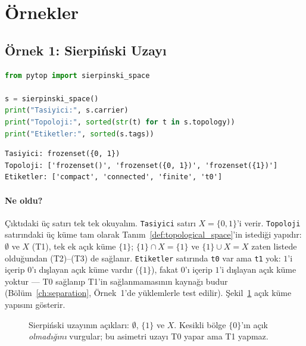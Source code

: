 \section{Örnekler}

\subsection{Örnek 1: Sierpiński Uzayı}

\begin{lstlisting}[language=Python, caption={Sierpiński uzayı}]
from pytop import sierpinski_space

s = sierpinski_space()
print("Tasiyici:", s.carrier)
print("Topoloji:", sorted(str(t) for t in s.topology))
print("Etiketler:", sorted(s.tags))
\end{lstlisting}

\begin{lstlisting}[caption={Çıktı}]
Tasiyici: frozenset({0, 1})
Topoloji: ['frozenset()', 'frozenset({0, 1})', 'frozenset({1})']
Etiketler: ['compact', 'connected', 'finite', 't0']
\end{lstlisting}

\paragraph{Ne oldu?}
Çıktıdaki üç satırı tek tek okuyalım. \texttt{Tasiyici} satırı
$X=\{0,1\}$'i verir. \texttt{Topoloji} satırındaki üç küme tam olarak
Tanım~\ref{def:topological_space}'in istediği yapıdır: $\emptyset$ ve
$X$ (T1), tek ek açık küme $\{1\}$; $\{1\}\cap X=\{1\}$ ve
$\{1\}\cup X=X$ zaten listede olduğundan (T2)--(T3) de sağlanır.
\texttt{Etiketler} satırında \texttt{t0} var ama \texttt{t1} yok:
$1$'i içerip $0$'ı dışlayan açık küme vardır ($\{1\}$), fakat $0$'ı
içerip $1$'i dışlayan açık küme yoktur --- T0 sağlanıp T1'in
sağlanmamasının kaynağı budur (Bölüm~\ref{ch:separation}, Örnek~1'de
yüklemlerle test edilir). Şekil~\ref{fig:ch04:sierpinski} açık küme
yapısını gösterir.

\begin{figure}[ht]
  \centering
  
  \caption{Sierpiński uzayının açıkları: $\emptyset$, $\{1\}$ ve $X$.
    Kesikli bölge $\{0\}$'ın açık \emph{olmadığını} vurgular; bu
    asimetri uzayı T0 yapar ama T1 yapmaz.}
  \label{fig:ch04:sierpinski}
\end{figure}

